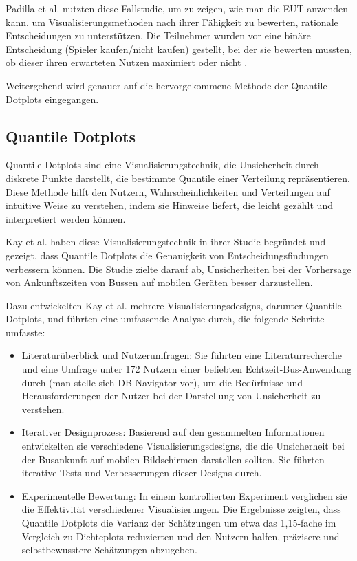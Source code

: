 Padilla et al. nutzten diese Fallstudie, um zu zeigen, wie man die EUT anwenden kann, um Visualisierungsmethoden nach ihrer Fähigkeit zu bewerten, rationale Entscheidungen zu unterstützen. Die Teilnehmer wurden vor eine binäre Entscheidung (Spieler kaufen/nicht kaufen) gestellt, bei der sie bewerten mussten, ob dieser ihren erwarteten Nutzen maximiert oder nicht \cite{VisualizationPsychology2023}.

Weitergehend wird genauer auf die hervorgekommene Methode der Quantile Dotplots eingegangen.

\subsection{Quantile Dotplots}

Quantile Dotplots sind eine Visualisierungstechnik, die Unsicherheit durch diskrete Punkte darstellt, die bestimmte Quantile einer Verteilung repräsentieren. Diese Methode hilft den Nutzern, Wahrscheinlichkeiten und Verteilungen auf intuitive Weise zu verstehen, indem sie Hinweise liefert, die leicht gezählt und interpretiert werden können.

Kay et al. \cite{Kay2016} haben diese Visualisierungstechnik in ihrer Studie begründet und gezeigt, dass Quantile Dotplots die Genauigkeit von Entscheidungsfindungen verbessern können. Die Studie zielte darauf ab, Unsicherheiten bei der Vorhersage von Ankunftszeiten von Bussen auf mobilen Geräten besser darzustellen.

Dazu entwickelten Kay et al. mehrere Visualisierungsdesigns, darunter Quantile Dotplots, und führten eine umfassende Analyse durch, die folgende Schritte umfasste:

\begin{itemize}
    \item Literaturüberblick und Nutzerumfragen: Sie führten eine Literaturrecherche und eine Umfrage unter 172 Nutzern einer beliebten Echtzeit-Bus-Anwendung durch (man stelle sich DB-Navigator vor), um die Bedürfnisse und Herausforderungen der Nutzer bei der Darstellung von Unsicherheit zu verstehen.
    \item Iterativer Designprozess: Basierend auf den gesammelten Informationen entwickelten sie verschiedene Visualisierungsdesigns, die die Unsicherheit bei der Busankunft auf mobilen Bildschirmen darstellen sollten. Sie führten iterative Tests und Verbesserungen dieser Designs durch.
    \item Experimentelle Bewertung: In einem kontrollierten Experiment verglichen sie die Effektivität verschiedener Visualisierungen. Die Ergebnisse zeigten, dass Quantile Dotplots die Varianz der Schätzungen um etwa das 1,15-fache im Vergleich zu Dichteplots reduzierten und den Nutzern halfen, präzisere und selbstbewusstere Schätzungen abzugeben.
\end{itemize}

